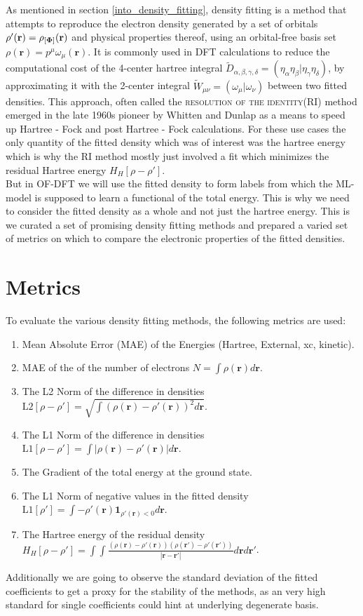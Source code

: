 As mentioned in section \ref{into_density_fitting}, density fitting is a method that attempts to reproduce the electron density generated by a set of orbitals $\rho'(\mathbf{r}) = \rho_{[\mathbf{\Phi}]}(\mathbf{r})$ and physical properties thereof, using an orbital-free basis set $\rho(\mathbf{r}) = p^\mu \omega_\mu(\mathbf{r})$. It is commonly used in DFT calculations to reduce the computational cost of the 4-center hartree integral $\tilde{D}_{\alpha,\beta,\gamma,\delta}  = (\eta_\alpha\eta_\beta|\eta_\gamma\eta_\delta)$, by approximating it with the 2-center integral $\tilde{W}_{\mu\nu} = (\omega_\mu |\omega_\nu)$ between two fitted densities. This approach, often called the \textsc{resolution of the identity}(RI) method emerged in the late 1960s pioneer by Whitten\cite{whitten1973} and Dunlap\cite{dunlap1979} as a means to speed up Hartree - Fock and post Hartree - Fock calculations.
For these use cases the only quantity of the fitted density which was of interest was the hartree energy which is why the RI method mostly just involved a fit which minimizes the residual Hartree energy $H_H[\rho-\rho']$.\\
But in OF-DFT we will use the fitted density to form labels from which the ML- model is supposed to learn a functional of the total energy. This is why we need to consider the fitted density as a whole and not just the hartree energy. This is we curated a set of promising density fitting methods and prepared a varied set of metrics on which to compare the electronic properties of the fitted densities.\\
\section{Metrics} \label{metrics}
To evaluate the various density fitting methods, the following metrics are used:
\begin{enumerate}
    \item Mean Absolute Error (MAE) of the Energies (Hartree, External, xc, kinetic).
    \item MAE of the of the number of electrons $N = \int \rho(\mathbf{r}) d\mathbf{r}$.
    \item The L2 Norm of the difference in densities $\text{L2}[\rho-\rho'] = \sqrt{\int (\rho(\mathbf{r})-\rho'(\mathbf{r}))^2 d\mathbf{r}} $.
    \item The L1 Norm of the difference in densities $\text{L1}[\rho-\rho'] = \int |\rho(\mathbf{r})-\rho'(\mathbf{r})| d\mathbf{r}$.
    \item The Gradient of the total energy at the ground state.
    \item The L1 Norm of negative values in the fitted density $\text{L1}[\rho'] = \int -\rho'(\mathbf{r})\mathbf{1}_{\rho'(\mathbf{r})<0} d\mathbf{r}$.
    \item The Hartree energy of the residual density $H_{H}[\rho-\rho'] = \int \int \frac{(\rho(\mathbf{r})-\rho'(\mathbf{r}))(\rho(\mathbf{r'})-\rho'(\mathbf{r'}))}{|\mathbf{r}-\mathbf{r'}|}d\mathbf{r}d\mathbf{r'}$.
\end{enumerate}
Additionally we are going to observe the standard deviation of the fitted coefficients to get a proxy for the stability of the methods, as an very high standard for single coefficients could hint at underlying degenerate basis.
